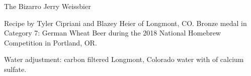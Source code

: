 \begin{recipe}{The Bizarro Jerry Weissbier}

\begin{aboutblock}
Recipe by Tyler Cipriani and Blazey Heier of Longmont, CO. Bronze medal in 
Category 7: German Wheat Beer during the 2018 National Homebrew Competition
in Portland, OR. \sourceaha
\end{aboutblock}


\begin{methodandtiming}
 
\begin{mashsteps}
\end{mashsteps}

\begin{fermentationsteps}
\end{fermentationsteps}

\begin{directions}
Water adjustment: carbon filtered Longmont, Colorado water with  of
calcium sulfate.
\end{directions}

\end{methodandtiming}

\recipebreak

\begin{ingredientsblock}

\begin{malts}
\end{malts}

\begin{hops}
\end{hops}


\end{ingredientsblock}

\end{recipe}

